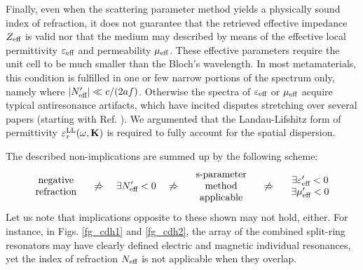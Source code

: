 Finally, even when the scattering parameter method yields a physically sound index of refraction, it does not guarantee that the retrieved effective impedance $Z_{\text{eff} }$ is valid nor that the medium may described by means of the effective local permittivity $\varepsilon_{\text{eff} }$ and permeability $\mu_{\text{eff} }$. These effective parameters require the unit cell to be much smaller than the Bloch's wavelength. In most metamaterials, this condition is fulfilled in one or few narrow portions of the spectrum only, namely where $|N_{\text{eff} }'| \ll c/(2af)$. Otherwise the spectra of $\varepsilon_{\text{eff} }$ or $\mu_{\text{eff} }$ acquire typical antiresonance artifacts, which have incited disputes stretching over several papers (starting with Ref. \cite{koschny2003resonant}). We argumented that the Landau-Lifshitz form of permittivity $\varepsilon_r^\text{LL}(\omega,{\mathbf{K}})$ is required to fully account for the spatial dispersion. 

The described non-implications are summed up by the following scheme:
\begin{equation}
\begin{array}{c} \text{negative}\\ \text{refraction} \end{array}
\quad\not\Rightarrow\quad  \exists N_{\text{eff} }' < 0 
\quad\not\Rightarrow\quad \begin{array}{c} \text{s-parameter}\\ \text{method}\\ \text{applicable}  \end{array}
\quad\not\Rightarrow\quad \begin{array}{c} \exists \varepsilon_{\text{eff} }'<0\\ \exists\mu_{\text{eff} }'<0  \end{array} 
\label{eq_implications}\end{equation} %
Let us note that implications opposite to these shown may not hold, either.  For instance, in Figs. \ref{fg_cdh1} and \ref{fg_cdh2}, the array of the combined split-ring resonators may have clearly defined electric and magnetic individual resonances, yet the index of refraction $N_{\text{eff} }$ is not applicable when they overlap.



